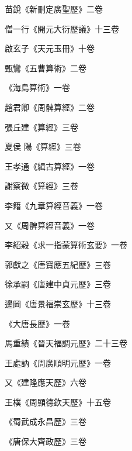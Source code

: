 
\begin{pinyinscope}

 苗銳《新刪定廣聖歷》二卷



 僧一行《開元大衍歷議》十三卷



 啟玄子《天元玉冊》十卷



 甄鸞《五曹算術》二卷



 《海島算術》一卷



 趙君卿《周髀算經》二卷



 張丘建《算經》三卷



 夏侯
 陽《算經》三卷



 王孝通《緝古算經》一卷



 謝察微《算經》三卷



 李籍《九章算經音義》一卷



 又《周髀算經音義》一卷



 李紹穀《求一指蒙算術玄要》一卷



 郭獻之《唐寶應五紀歷》三卷



 徐承嗣《唐建中貞元歷》三卷



 邊岡《唐景福崇玄歷》十三卷



 《大唐長歷》一卷



 馬重績《晉天福調元歷》二十三卷



 王處訥《周廣順明元歷》一卷



 又《建隆應天歷》六卷



 王樸《周顯德欽天歷》十五卷



 《蜀武成永昌歷》三卷



 《唐保大齊政歷》三卷




\end{pinyinscope}

